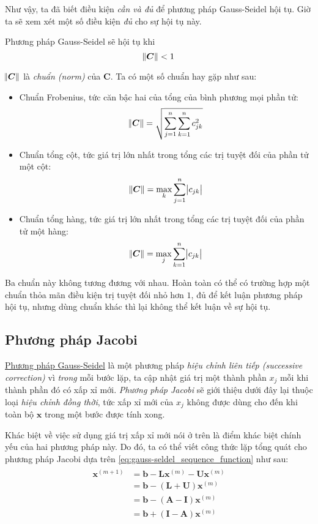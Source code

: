 \documentclass[../../Lectures]{subfiles}
\begin{document}
Như vậy, ta đã biết điều kiện \emph{cần và đủ} để phương pháp Gauss-Seidel hội
tụ. Giờ ta sẽ xem xét một số điều kiện \emph{đủ} cho sự hội tụ này.

Phương pháp Gauss-Seidel sẽ hội tụ khi
\[\norm{\bm{C}} < 1\]

\(\norm{\bm{C}}\) là \emph{chuẩn (norm)} của \(\bm{C}\). Ta có một số chuẩn hay
gặp như sau:
\begin{itemize}
    \item Chuẩn Frobenius, tức căn bậc hai của tổng của bình phương mọi phần tử:
        \[\norm{\bm{C}} = \sqrt{\sum_{j = 1}^n \sum_{k = 1}^n c_{jk}^2}\]

    \item Chuẩn tổng cột, tức giá trị lớn nhất trong tổng các trị tuyệt đối của
        phần tử một cột:
        \[\norm{\bm{C}} = \max_k \sum_{j = 1}^n \abs{c_{jk}}\]

    \item Chuẩn tổng hàng, tức giá trị lớn nhất trong tổng các trị tuyệt đối của
        phần tử một hàng:
        \[\norm{\bm{C}} = \max_j \sum_{k = 1}^n \abs{c_{jk}}\]
\end{itemize}

Ba chuẩn này không tương đương với nhau. Hoàn toàn có thể có trường hợp một
chuẩn thỏa mãn điều kiện trị tuyệt đối nhỏ hơn \(1\), đủ để kết luận phương pháp
hội tụ, nhưng dùng chuẩn khác thì lại không thể kết luận về sự hội tụ.

\subsection{Phương pháp Jacobi}

\hyperref[method:gauss-seidel]{Phương pháp Gauss-Seidel} là một phương pháp
\emph{hiệu chỉnh liên tiếp (successive correction)} vì \emph{trong} mỗi bước
lặp, ta cập nhật giá trị một thành phần \(x_j\) mỗi khi thành phần đó có xấp xỉ
mới. \emph{Phương pháp Jacobi} sẽ giới thiệu dưới đây lại thuộc loại \emph{hiệu
chỉnh đồng thời}, tức xấp xỉ mới của \(x_j\) không được dùng cho đến khi toàn bộ
\(\bm{x}\) trong một bước được tính xong.

Khác biệt về việc sử dụng giá trị xấp xỉ mới nói ở trên là điểm khác biệt chính
yếu của hai phương pháp này. Do đó, ta có thể viết công thức lặp tổng quát cho
phương pháp Jacobi dựa trên \eqref{eq:gauss-seldel_sequence_function} như sau:
\begin{align}
    \begin{aligned}
        \bm{x}^{(m + 1)} &= \bm{b} - \bm{L} \bm{x}^{(m)} - \bm{U} \bm{x}^{(m)} \\
                         &= \bm{b} - (\bm{L} + \bm{U}) \bm{x}^{(m)} \\
                         &= \bm{b} - (\bm{A} - \bm{I}) \bm{x}^{(m)} \\
                         &= \bm{b} + (\bm{I} - \bm{A}) \bm{x}^{(m)} \\
    \end{aligned}
\end{align}
\end{document}
